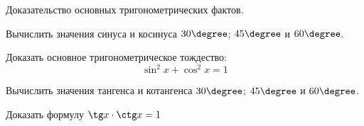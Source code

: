 \begin{ex}
	\begin{condition}
		Доказательство основных тригонометрических фактов.
		\begin{enumcols}[label=\arabic*)]
			\item Вычислить значения синуса и косинуса \( 30\degree \); \( 45\degree \) и \( 60\degree \).
			\item Доказать основное тригонометрическое тождество: \[ \sin^2 x + \cos^2 x = 1 \]
			\item Вычислить значения тангенса и котангенса \( 30\degree \); \( 45\degree \) и \( 60\degree \).
			\item Доказать формулу \( \tg x \cdot \ctg x = 1 \)
		\end{enumcols}
	\end{condition}
\end{ex}